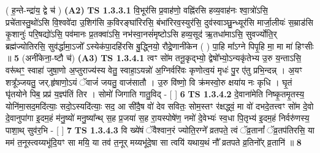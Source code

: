 \documentclass[17pt]{extarticle}
\begin{document}
                  \newline
                      ( ह॒न्ते-न्द्रा॑य॒ द्वे च॑ )  \textbf{(A2)} \newline \newline
                                        \textbf{ TS 1.3.3.1} \newline
                  वि॒भूर॑सि प्र॒वाह॑णो॒ वह्नि॑रसि हव्य॒वाह॑नः श्वा॒त्रो॑ऽसि॒ प्रचे॑तास्तु॒थो॑ऽसि वि॒श्ववे॑दा उ॒शिग॑सि क॒विरङ्घा॑रिरसि॒ बंभा॑रिरव॒स्युर॑सि॒ दुव॑स्वाञ्छु॒न्ध्यूर॑सि मार्जा॒लीयः॑ स॒म्राड॑सि कृ॒शानुः॑ परि॒षद्यो॑ऽसि॒ पव॑मानः प्र॒तक्वा॑ऽसि॒ नभ॑स्वा॒नसं॑मृष्टोऽसि हव्य॒सूद॑ ऋ॒तधा॑माऽसि॒ सुवर्ज्योति॒र् ब्रह्म॑ज्योतिरसि॒ सुव॑र्द्धामा॒ऽजो᳚ ऽस्येक॑पा॒दहि॑रसि बु॒द्ध्नियो॒ रौद्रे॒णानी॑केन ( ) पा॒हि मा᳚ऽग्ने पिपृ॒हि मा॒ मा मा॑ हिꣳसीः ॥ \textbf{  5 } \newline
                  \newline
                      (अनी॑केना॒-ष्टौ च॑)  \textbf{(A3)} \newline \newline
                                        \textbf{ TS 1.3.4.1} \newline
                  त्वꣳ सो॑म तनू॒कृद्भ्यो॒ द्वेषो᳚भ्यो॒ऽन्यकृ॑तेभ्य उ॒रु य॒न्ताऽसि॒ वरू॑थꣳ॒॒ स्वाहा॑ जुषा॒णो अ॒प्तुराज्य॑स्य वेतु॒ स्वाहा॒ऽयन्नो॑ अ॒ग्निर्वरि॑वः कृणोत्व॒यं मृधः॑ पु॒र ए॑तु प्रभि॒न्दन्न्  । अ॒यꣳ शत्रू᳚ञ्जयतु॒ जर्.हृ॑षाणो॒ऽयं ॅवाजं॑ जयतु॒ वाज॑सातौ । उ॒रु वि॑ष्णो॒ वि क्र॑मस्वो॒रु क्षया॑य नः कृधि । घृ॒तं घृ॑तयोने पिब॒ प्रप्र॑ य॒ज्ञ्प॑तिं तिर । सोमो॑ जिगाति गातु॒विद् - [ ] \textbf{  6} \newline
                  \newline
                                \textbf{ TS 1.3.4.2} \newline
                  दे॒वाना॑मेति निष्कृ॒तमृ॒तस्य॒ योनि॑मा॒सद॒मदि॑त्याः॒ सदो॒ऽस्यदि॑त्याः॒ सद॒ आ सी॑दै॒ष वो॑ देव सवितः॒ सोम॒स्तꣳ र॑क्षद्ध्वं॒ मा वो॑ दभदे॒तत्त्वꣳ सो॑म दे॒वो दे॒वानुपा॑गा इ॒दम॒हं म॑नु॒ष्यो॑ मनु॒ष्या᳚न्थ् स॒ह प्र॒जया॑ स॒ह रा॒यस्पोषे॑ण॒ नमो॑ दे॒वेभ्यः॑ स्व॒धा पि॒तृभ्य॑ इ॒दम॒हं निर्वरु॑णस्य॒ पाशा॒थ् सुव॑र॒भि - [ ] \textbf{  7} \newline
                  \newline
                                \textbf{ TS 1.3.4.3} \newline
                  वि ख्ये॑षं ॅवैश्वान॒रं ज्योति॒रग्ने᳚ व्रतपते॒ त्वं ॅव्र॒तानां᳚ ॅव्र॒तप॑तिरसि॒ या मम॑ त॒नूस्त्वय्यभू॑दि॒यꣳ सा मयि॒ या तव॑ त॒नूर् मय्यभू॑दे॒षा सा त्वयि॑ यथाय॒थं नौ᳚ व्रतपते व्र॒तिनो᳚र् व्र॒तानि॑ ॥ \textbf{  8} \newline
\end{document}
